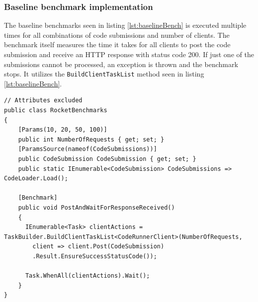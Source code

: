 \subsubsection{Baseline benchmark implementation}
The baseline benchmarks seen in listing \ref{lst:baselineBench} is executed multiple times for all combinations of code submissions and number of clients.
The benchmark itself measures the time it takes for all clients to post the code submission and receive an HTTP response with status code 200.
If just one of the submissions cannot be processed, an exception is thrown and the benchmark stops.
It utilizes the \texttt{BuildClientTaskList} method seen in listing \ref{lst:baselineBench}.
\begin{lstlisting}[language=CSharp, escapechar=~, caption={C\# code showing the benchmark implementation for the synchronous baseline}, label={lst:baselineBench}]
// Attributes excluded
public class RocketBenchmarks
{
    [Params(10, 20, 50, 100)] 
    public int NumberOfRequests { get; set; }
    [ParamsSource(nameof(CodeSubmissions))]
    public CodeSubmission CodeSubmission { get; set; }
    public static IEnumerable<CodeSubmission> CodeSubmissions => CodeLoader.Load();

    [Benchmark]
    public void PostAndWaitForResponseReceived()
    {
      IEnumerable<Task> clientActions = TaskBuilder.BuildClientTaskList<CodeRunnerClient>(NumberOfRequests,
        client => client.Post(CodeSubmission)
        .Result.EnsureSuccessStatusCode());
        
      Task.WhenAll(clientActions).Wait();
    }
}
\end{lstlisting}

